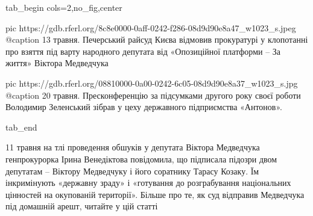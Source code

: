  
 
 
 
 


\ifcmt
  tab_begin cols=2,no_fig,center

		pic https://gdb.rferl.org/8c8e0000-0aff-0242-f286-08d9d90e8a47_w1023_s.jpeg
		@caption 13 травня. Печерський райсуд Києва відмовив прокуратурі у клопотанні про взяття під варту народного депутата від «Опозиційної платформи – За життя» Віктора Медведчука

		pic https://gdb.rferl.org/08810000-0a00-0242-6c05-08d9d90e8a37_w1023_s.jpg
		@caption 20 травня. Пресконференцію за підсумками другого року своєї роботи Володимир Зеленський зібрав у цеху державного підприємства «Антонов».

  tab_end
\fi

11 травня на тлі проведення обшуків у депутата Віктора Медведчука генпрокурорка
Ірина Венедіктова повідомила, що підписала підозри двом депутатам – Віктору
Медведчуку і його соратнику Тарасу Козаку. Їм інкримінують «державну зраду» і
«готування до розграбування національних цінностей на окупованій території».
Більше про те, як суд відправив Медведчука під домашній арешт, читайте у цій
статті 
 
